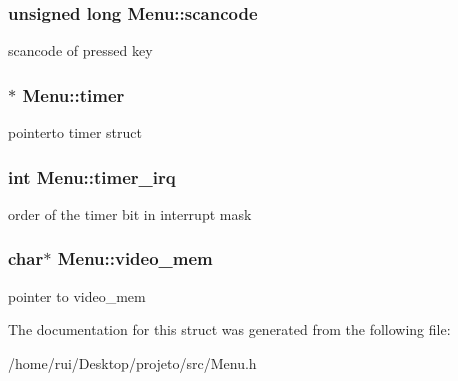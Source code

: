 \subsubsection[{\texorpdfstring{scancode}{scancode}}]{\setlength{\rightskip}{0pt plus 5cm}unsigned long Menu\+::scancode}\hypertarget{structMenu_ae9efd9d3d5e409c34f0b58b095103c86}{}\label{structMenu_ae9efd9d3d5e409c34f0b58b095103c86}
scancode of pressed key 
\subsubsection[{\texorpdfstring{timer}{timer}}]{$\ast$ Menu\+::timer}\hypertarget{structMenu_a6345b63b899f46defb8ad61fdf000c00}{}\label{structMenu_a6345b63b899f46defb8ad61fdf000c00}
pointerto timer struct 
\subsubsection[{\texorpdfstring{timer\+\_\+irq}{timer_irq}}]{\setlength{\rightskip}{0pt plus 5cm}int Menu\+::timer\+\_\+irq}\hypertarget{structMenu_abbc34ac236d2d57a45a856402d8e3f1b}{}\label{structMenu_abbc34ac236d2d57a45a856402d8e3f1b}
order of the timer bit in interrupt mask 
\subsubsection[{\texorpdfstring{video\+\_\+mem}{video_mem}}]{\setlength{\rightskip}{0pt plus 5cm}char$\ast$ Menu\+::video\+\_\+mem}\hypertarget{structMenu_a80b884d6ba518e2aaf394d7610ac5ef4}{}\label{structMenu_a80b884d6ba518e2aaf394d7610ac5ef4}
pointer to video\+\_\+mem 

The documentation for this struct was generated from the following file\+:\begin{DoxyCompactItemize}
\item 
/home/rui/\+Desktop/projeto/src/Menu.\+h\end{DoxyCompactItemize}
